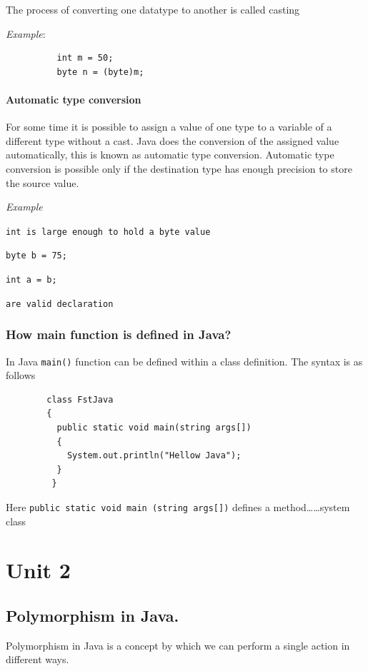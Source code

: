 \documentclass[11pt, a4paper]{book}
\begin{document}
        The process of converting one datatype to another is called casting 

        \textit{Example}:

        \begin{lstlisting}
          int m = 50;
          byte n = (byte)m;
        \end{lstlisting}

      \subsubsection{Automatic type conversion}
        For some time it is possible to assign a value of one type to a variable of a different type without a cast. Java does the conversion of the assigned value automatically, this is known as automatic type conversion. Automatic  type conversion is possible only if the destination type has enough
        precision to store the source value.

        \textit{Example}

        \texttt{int is large enough to hold a byte value }

        \texttt{byte b = 75;}

        \texttt{int a = b;}

        \texttt{are valid declaration}

    \subsection{How main function is defined in Java?}
      In Java \texttt{main()} function can be defined within a class definition. The syntax is as follows

      \begin{lstlisting}
        class FstJava
        {
          public static void main(string args[])
          {
            System.out.println("Hellow Java");
          }
         }
      \end{lstlisting}
  
      Here \texttt{public static void main (string args[])} defines a method\dots\dots system class%

            \chapter{Unit 2}%
  \section{Polymorphism in Java.}
  Polymorphism in Java is a concept by which we can perform a
  single action in different ways.
\end{document}

